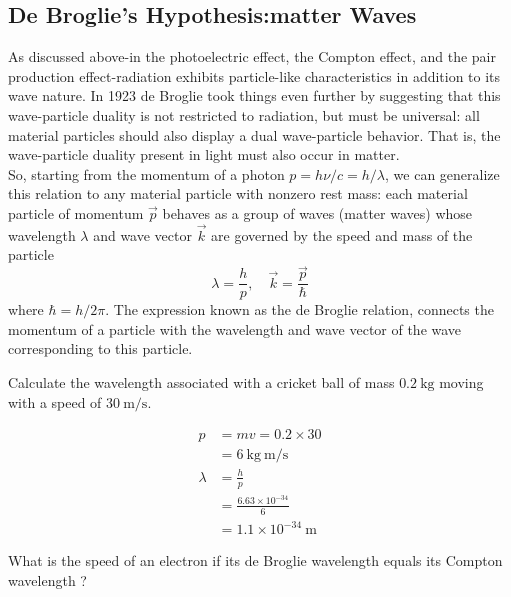 \subsection{De Broglie's Hypothesis:matter Waves}
As discussed above-in the photoelectric effect, the Compton effect, and the pair production effect-radiation exhibits particle-like characteristics in addition to its wave nature. In 1923 de Broglie took things even further by suggesting that this wave-particle duality is not restricted to radiation, but must be universal: all material particles should also display a dual wave-particle behavior. That is, the wave-particle duality present in light must also occur in matter.\\
So, starting from the momentum of a photon $p=h \nu / c=h / \lambda$, we can generalize this relation to any material particle  with nonzero rest mass: each material particle of momentum $\vec{p}$ behaves as a group of waves (matter waves) whose wavelength $\lambda$ and wave vector $\vec{k}$ are governed by the speed and mass of the particle\\
$$\lambda=\frac{h}{p}, \quad \vec{k}=\frac{\vec{p}}{\hbar}$$
where $\hbar=h / 2 \pi$. The expression known as the de Broglie relation, connects the momentum of a particle with the wavelength and wave vector of the wave corresponding to this particle.\\
\begin{exercise}
	Calculate the wavelength associated with a cricket ball of mass $0.2 \mathrm{~kg}$ moving with a speed of $30 \mathrm{~m} / \mathrm{s}$.
\end{exercise}
\begin{answer}
	\begin{align*}
	p&=m v=0.2 \times 30\\&=6 \mathrm{~kg} \mathrm{~m} / \mathrm{s} \\
	\lambda&=\frac{h}{p}\\&=\frac{6.63 \times 10^{-34}}{6}\\&=1.1 \times 10^{-34} \mathrm{~m}
	\end{align*}
\end{answer}
\begin{exercise}
	What is the speed of an electron if its de Broglie wavelength equals its Compton wavelength ?
\end{exercise}
